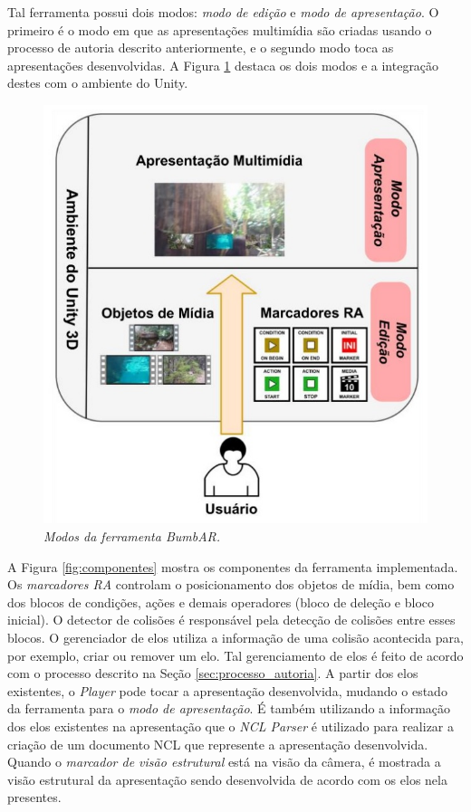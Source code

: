 \documentclass[../main.tex]{subfiles}
\begin{document}
Tal ferramenta possui dois modos: \emph{modo de edição} e \emph{modo de apresentação}. O primeiro é o modo em que as apresentações multimídia são criadas usando o processo de autoria descrito anteriormente, e o segundo modo toca as apresentações desenvolvidas. A Figura \ref{fig:modos} destaca os dois modos e a integração destes com o ambiente do Unity.

\begin{figure}[!ht]
\centering
\includegraphics[width=0.45\linewidth]{IMG/modos.jpg}
\caption{\textit{Modos da ferramenta BumbAR.}}
\label{fig:modos}
\end{figure}

A Figura \ref{fig:componentes} mostra os componentes da ferramenta implementada. Os \emph{marcadores RA} controlam o posicionamento dos objetos de mídia, bem como dos blocos de condições, ações e demais operadores (bloco de deleção e bloco inicial). O detector de colisões é responsável pela detecção de colisões entre esses blocos. O gerenciador de elos utiliza a informação de uma colisão acontecida para, por exemplo, criar ou remover um elo. Tal gerenciamento de elos é feito de acordo com o processo descrito na Seção \ref{sec:processo_autoria}. A partir dos elos existentes, o \emph{Player} pode tocar a apresentação desenvolvida, mudando o estado da ferramenta para o \emph{modo de apresentação}. É também utilizando a informação dos elos existentes na apresentação que o \emph{NCL Parser} é utilizado para realizar a criação de um documento NCL que represente a apresentação desenvolvida. Quando o \emph{marcador de visão estrutural} está na visão da câmera, é mostrada a visão estrutural da apresentação sendo desenvolvida de acordo com os elos nela presentes.
\end{document}
